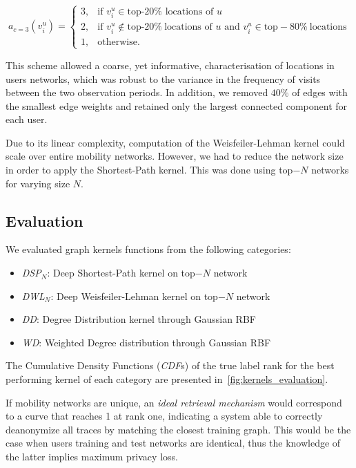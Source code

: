 \begin{equation*}
	a_{c=3}\left(v_i^u\right)=
	\begin{cases}
		 3, &  \mbox{if } v_i^u \in \mbox{top-20\%~locations of } u  \\
		 2, &  \mbox{if } v_i^u  \notin \mbox{top-20}\%~\mbox{locations of }  u   \mbox{ and }  v_i^u \in \mbox{top}-80\%~\mbox{locations}\\
		 1, &  \mbox{otherwise}.
	\end{cases}
\end{equation*}

This scheme allowed a coarse, yet informative, characterisation of locations in users networks, which was robust to the variance in the frequency of visits between the two observation periods. In addition, we removed $40\%$ of edges with the smallest edge weights and retained only the largest connected component for each user.


Due to its linear complexity, computation of the Weisfeiler-Lehman kernel could scale over entire mobility networks.
However, we had to reduce the network size in order to apply the Shortest-Path kernel.
This was done using top$-N$ networks for varying size $N$.



\subsection{Evaluation}

We evaluated graph kernels functions from the following categories:
\begin{itemize}
	\item \emph{DSP}$_{N}$: Deep Shortest-Path kernel on top$-N$ network
	\item \emph{DWL}$_{N}$: Deep Weisfeiler-Lehman kernel on top$-N$ network
	\item \emph{DD}: Degree Distribution kernel through Gaussian RBF
	\item \emph{WD}: Weighted Degree distribution through Gaussian RBF
\end{itemize}
The  Cumulative Density Functions (\emph{CDF}s) of the  true label rank for the best performing kernel of each category are presented in~\cref{fig:kernels_evaluation}.

If mobility networks are unique, an \emph{ideal retrieval mechanism} would correspond to a curve that reaches 1 at rank one, indicating a system able to correctly deanonymize all traces by matching the closest training graph.
This would be the case when users training and test networks are identical, thus the knowledge of the latter implies maximum privacy loss.

